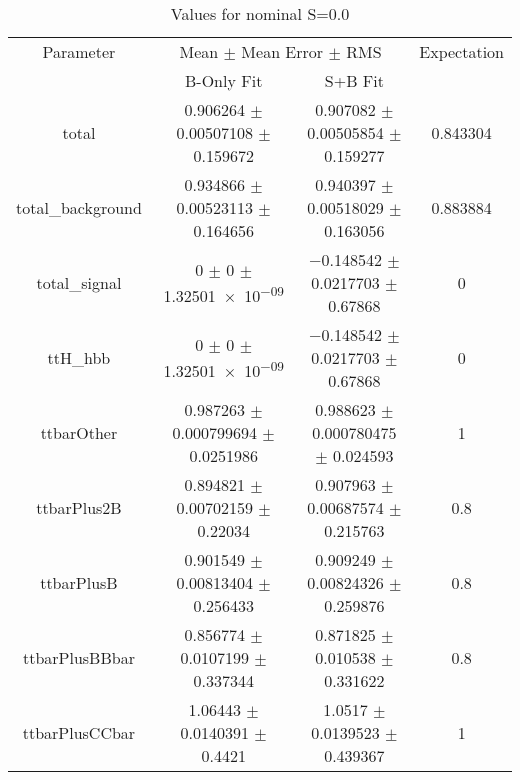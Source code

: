 \begin{table}
\centering
\caption{Values for nominal S=0.0}
\begin{tabular}{cccc}
\toprule
Parameter & \multicolumn{2}{c}{Mean $\pm$ Mean Error $\pm$ RMS} & Expectation\\
 & B-Only Fit & S+B Fit & \\
\midrule
total & \num{0.906264} $\pm$ \num{0.00507108} $\pm$ \num{0.159672} & \num{0.907082} $\pm$ \num{0.00505854} $\pm$ \num{0.159277} & \num{0.843304}\\
total\_background & \num{0.934866} $\pm$ \num{0.00523113} $\pm$ \num{0.164656} & \num{0.940397} $\pm$ \num{0.00518029} $\pm$ \num{0.163056} & \num{0.883884}\\
total\_signal & \num{0} $\pm$ \num{0} $\pm$ \num{1.32501e-09} & \num{-0.148542} $\pm$ \num{0.0217703} $\pm$ \num{0.67868} & \num{0}\\
ttH\_hbb & \num{0} $\pm$ \num{0} $\pm$ \num{1.32501e-09} & \num{-0.148542} $\pm$ \num{0.0217703} $\pm$ \num{0.67868} & \num{0}\\
ttbarOther & \num{0.987263} $\pm$ \num{0.000799694} $\pm$ \num{0.0251986} & \num{0.988623} $\pm$ \num{0.000780475} $\pm$ \num{0.024593} & \num{1}\\
ttbarPlus2B & \num{0.894821} $\pm$ \num{0.00702159} $\pm$ \num{0.22034} & \num{0.907963} $\pm$ \num{0.00687574} $\pm$ \num{0.215763} & \num{0.8}\\
ttbarPlusB & \num{0.901549} $\pm$ \num{0.00813404} $\pm$ \num{0.256433} & \num{0.909249} $\pm$ \num{0.00824326} $\pm$ \num{0.259876} & \num{0.8}\\
ttbarPlusBBbar & \num{0.856774} $\pm$ \num{0.0107199} $\pm$ \num{0.337344} & \num{0.871825} $\pm$ \num{0.010538} $\pm$ \num{0.331622} & \num{0.8}\\
ttbarPlusCCbar & \num{1.06443} $\pm$ \num{0.0140391} $\pm$ \num{0.4421} & \num{1.0517} $\pm$ \num{0.0139523} $\pm$ \num{0.439367} & \num{1}\\
\bottomrule
\end{tabular}
\end{table}
